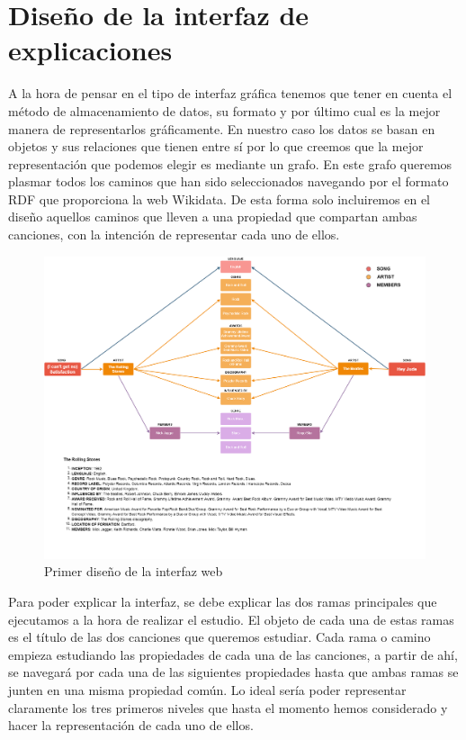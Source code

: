 \chapter{Diseño de la interfaz de explicaciones}
\label{cap:interfaz}

A la hora de pensar en el tipo de interfaz gráfica tenemos que tener en cuenta el método de almacenamiento de datos, su formato y por último cual es la mejor manera de representarlos gráficamente. En nuestro caso los datos se basan en objetos y sus relaciones que tienen entre sí por lo que creemos que la mejor representación que podemos elegir es mediante un grafo.
En este grafo queremos plasmar todos los caminos que han sido seleccionados navegando por el formato RDF que proporciona la web Wikidata. De esta forma solo incluiremos en el diseño aquellos caminos que lleven a una propiedad que compartan ambas canciones, con la intención de representar cada uno de ellos.

\begin{figure}[h!]
	\centering
	\includegraphics[width = 1\textwidth]{Imagenes/Bitmap/InterfaceResult.png}
	\caption{Primer diseño de la interfaz web}
	\label{fig:sampleImage}
\end{figure}

Para poder explicar la interfaz, se debe explicar las dos ramas principales que ejecutamos a la hora de realizar el estudio. El objeto de cada una de estas ramas es el título de las dos canciones que queremos estudiar. Cada rama o camino empieza estudiando las propiedades de cada una de las canciones, a partir de ahí, se navegará por cada una de las siguientes propiedades hasta que ambas ramas se junten en una misma propiedad común.
Lo ideal sería poder representar claramente los tres primeros niveles que hasta el momento hemos considerado y hacer la representación de cada uno de ellos.

